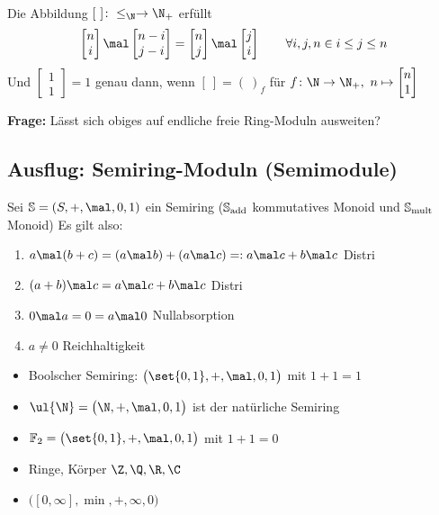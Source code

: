 \begin{bemerkungnr}
\begin{align*}
	\end{align*}
	Die Abbildung $[~]\colon\leq_\N\to\N_+$ erfüllt
	\begin{align*}
		\begin{bmatrix}
			n\\
			i
		\end{bmatrix}\mal
		\begin{bmatrix}
			n-i\\
			j-i
		\end{bmatrix}=\begin{bmatrix}
			n\\
			j
		\end{bmatrix}\mal
		\begin{bmatrix}
			j\\
			i
		\end{bmatrix}\qquad\forall i,j,n\in\mit i\leq j\leq n
	\end{align*}
	Und $\begin{bmatrix}
		1\\
		1
	\end{bmatrix}=1$ genau dann, wenn $[~]=(~)_f$ für $f\colon\N\to\N_+,~n\mapsto\begin{bmatrix}
		n\\
		1
	\end{bmatrix}$
\end{bemerkungnr}

\textbf{Frage:} Lässt sich obiges auf endliche freie Ring-Moduln ausweiten?

\subsection{Ausflug: Semiring-Moduln (Semimodule)}
Sei $\S=(S,+,\mal,0,1)$ ein Semiring ($\mathbb{S}_{\operatorname{add}}$ kommutatives Monoid und $\mathbb{S}_{\operatorname{mult}}$ Monoid)
Es gilt also:
\begin{enumerate}
	\item $a\mal(b+c)=(a\mal b)+(a\mal c)=:a\mal c+b\mal c$ Distri
	\item $(a+b)\mal c=a\mal c+b\mal c$ Distri
	\item $0\mal a=0=a\mal 0$ Nullabsorption
	\item $a\neq 0$ Reichhaltigkeit
\end{enumerate}

\begin{beispiel}
	\begin{itemize}
		\item Boolscher Semiring: $\big(\set{0,1},+,\mal,0,1\big)$ mit $1+1=1$
		\item $\ul{\N}=\big(\N,+,\mal,0,1\big)$ ist der natürliche Semiring
		\item $\F_2=\big(\set{0,1},+,\mal,0,1\big)$ mit $1+1=0$
		\item Ringe, Körper $\Z,\Q,\R,\C$
		\item {} $\big([0,\infty],\min,+,\infty,0\big)$
	\end{itemize}
\end{beispiel}

